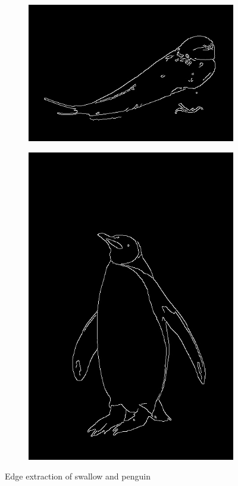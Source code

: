 \documentclass[conference]{IEEEtran}
\begin{document}
			\begin{figure}[!t]
				\centering
				\begin{subfigure}[!t]{0.48\linewidth}
					\centerline{\includegraphics[width=0.9\linewidth]{imgs/swallow_edges.jpg}}
				\end{subfigure}
				\begin{subfigure}[!t]{0.48\linewidth}
					\centerline{\includegraphics[height=0.4\textheight]{imgs/penguin_edges.jpg}}
				\end{subfigure}
				\caption{Edge extraction of swallow and penguin}
				\label{fig:7}
			\end{figure}
		
\end{document}

